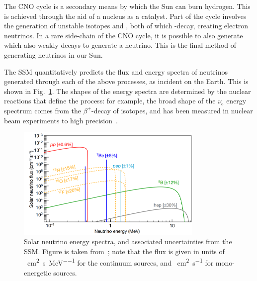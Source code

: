 The CNO cycle is a secondary means by which the Sun can burn hydrogen. This is achieved through the aid of a  nucleus as a catalyst. Part of the cycle involves the generation of unstable isotopes  and , both of which \ce{\beta^{+}}-decay, creating electron neutrinos. In a rare side-chain of the CNO cycle, it is possible to also generate  which also weakly decays to generate a neutrino. This is the final method of generating neutrinos in our Sun.

The SSM quantitatively predicts the flux and energy spectra of neutrinos generated through each of the above processes, as incident on the Earth. This is shown in Fig.~\ref{fig:ssm_neutrino_spectra}. The shapes of the energy spectra are determined by the nuclear reactions that define the process: for example, the broad shape of the \beight{} $\nu_{e}$ energy spectrum comes from the $\beta^{+}$-decay of \beight{} isotopes, and has been measured in nuclear beam experiments to high precision~\cite{winterB8NeutrinoSpectrum2006}. %

\begin{figure}
    \centering
    \includegraphics[width=0.8\textwidth]{1_NeutrinoTheory/Figs/solar_nu_energy_spec_SSM.png}
    \caption[Solar neutrino energy spectrum, and associated uncertainties from the SMM]
    {Solar neutrino energy spectra, and associated uncertainties from the SSM. Figure is taken from~\cite{agostiniComprehensiveMeasurementPpchain2018,vinyolesB16StandardSolar2018}; note that the flux is given in units of \si{\per\cm\squared\per\second\per\MeV} for the continuum sources, and \si{\per\cm\squared\per\second} for mono-energetic sources.}
    \label{fig:ssm_neutrino_spectra}
\end{figure}

